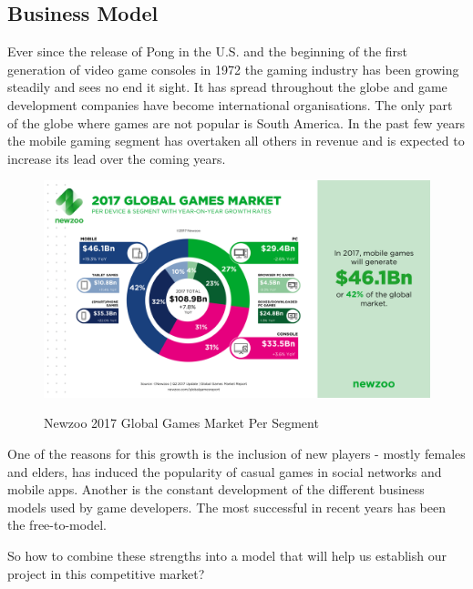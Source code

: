 \documentclass[12p]{article}
\begin{document}

\subsection{Business Model} 
Ever since the release of Pong\cite{Pong} in the U.S. and the beginning of the first generation of video game consoles in 1972 the gaming industry has been growing steadily and sees no end it sight. It has spread throughout the globe and game development companies have become international organisations. The only part of the globe where games are not popular is South America.\cite{GamesMarketRevenue} In the past few years the mobile gaming segment has overtaken all others in revenue and is expected to increase its lead over the coming years.

\begin{figure}[ht]
  \center
  \includegraphics[width=1\textwidth]{BusinessStrategy/Newzoo_2017_Global_Games_Market_Per_Segment_April_2017}
  \label{Newzoo_2017_Global_Games_Market_Per_Segment_April_2017}
  \caption{Newzoo 2017 Global Games Market Per Segment \cite{NezooScreenshot}}
\end{figure}

One of the reasons for this growth is the inclusion of new players - mostly females and elders, has induced the popularity of casual games in social networks and mobile apps. Another is the constant development of the different business models used by game developers. The most successful in recent years has been the free-to-model.\cite{BusinessModelsAndStrategy}

So how to combine these strengths into a model that will help us establish our project in this competitive market?
\end{document}
